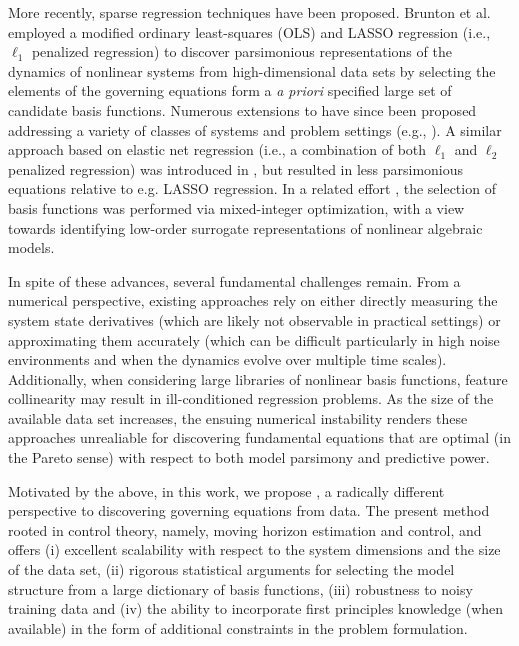 \documentclass[12pt]{article}
\begin{document}
More recently, sparse regression techniques \cite{tibshirani1996regression,zou2005regularization} have been proposed. Brunton et al. \cite{brunton2016discovering} employed a modified ordinary least-squares (OLS) and LASSO regression (i.e., $\ell_1$ penalized regression) to discover parsimonious representations of the dynamics of nonlinear systems  from high-dimensional data sets by selecting the elements of the governing equations form a \textit{a priori} specified large set of candidate basis functions. Numerous extensions to \cite{brunton2016discovering} have since been proposed addressing a variety of classes of systems and problem settings (e.g., \cite{mangan2016inferring,mangan2017model,kaiser2018sparse,champion2019data}).
A similar approach based on elastic net regression (i.e., a combination of both $\ell_1$ and $\ell_2$  penalized regression) was introduced in \cite{sun2020alven}, but resulted in less parsimonious equations relative to e.g. LASSO regression. In a related effort \cite{cozad2014learning}, the selection of basis functions was performed via mixed-integer optimization, with a view towards identifying low-order surrogate representations of nonlinear algebraic models. 

In spite of these advances, several  fundamental challenges  remain. From a numerical perspective, existing approaches rely on either directly measuring the system state derivatives (which are likely not observable in practical settings) or approximating them accurately (which can be  difficult particularly in high noise environments and when the dynamics evolve over multiple time scales). Additionally, when considering large libraries of nonlinear basis functions, feature collinearity may result in ill-conditioned regression problems. As the size of the available data set increases, the ensuing numerical instability renders these approaches unrealiable for discovering fundamental equations that are optimal (in the Pareto sense) with respect to both model parsimony and predictive power.

Motivated by the above, in this work, we propose \ours, a radically different perspective to discovering governing equations from data. The present method rooted in control theory, namely, moving horizon estimation and control, and offers (i) excellent scalability with respect to the system dimensions and the size of the data set, (ii) rigorous statistical arguments for selecting the model structure from a large dictionary of basis functions, (iii) robustness to noisy training data and (iv) the ability to incorporate first principles knowledge (when available) in the form of additional constraints in the problem formulation.
\end{document}
